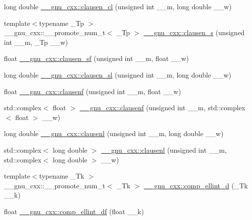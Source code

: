 \begin{DoxyCompactItemize}
\item 
long double \hyperlink{group__gnu__math__spec__func_ga5ff89833dc529ca3de5099e1b9c8525f}{\+\_\+\+\_\+gnu\+\_\+cxx\+::clausen\+\_\+cl} (unsigned int \+\_\+\+\_\+m, long double \+\_\+\+\_\+w)
\item 
{\footnotesize template$<$typename \+\_\+\+Tp $>$ }\\\+\_\+\+\_\+gnu\+\_\+cxx\+::\+\_\+\+\_\+promote\+\_\+num\+\_\+t$<$ \+\_\+\+Tp $>$ \hyperlink{group__gnu__math__spec__func_ga124827c09e71d83eb11b9e3282739475}{\+\_\+\+\_\+gnu\+\_\+cxx\+::clausen\+\_\+s} (unsigned int \+\_\+\+\_\+m, \+\_\+\+Tp \+\_\+\+\_\+w)
\item 
float \hyperlink{group__gnu__math__spec__func_ga2308b5828b5a8003d16cfa0f90826f94}{\+\_\+\+\_\+gnu\+\_\+cxx\+::clausen\+\_\+sf} (unsigned int \+\_\+\+\_\+m, float \+\_\+\+\_\+w)
\item 
long double \hyperlink{group__gnu__math__spec__func_ga6eb205278e3807367b62e07c3f39d915}{\+\_\+\+\_\+gnu\+\_\+cxx\+::clausen\+\_\+sl} (unsigned int \+\_\+\+\_\+m, long double \+\_\+\+\_\+w)
\item 
float \hyperlink{group__gnu__math__spec__func_ga9e228490e55e7936f77ae7a5ef9821dc}{\+\_\+\+\_\+gnu\+\_\+cxx\+::clausenf} (unsigned int \+\_\+\+\_\+m, float \+\_\+\+\_\+w)
\item 
std\+::complex$<$ float $>$ \hyperlink{group__gnu__math__spec__func_ga769ee593c5f1c1d8148abb9bebe50821}{\+\_\+\+\_\+gnu\+\_\+cxx\+::clausenf} (unsigned int \+\_\+\+\_\+m, std\+::complex$<$ float $>$ \+\_\+\+\_\+w)
\item 
long double \hyperlink{group__gnu__math__spec__func_gaac0a4d039044c04cd26c9b8559c441fd}{\+\_\+\+\_\+gnu\+\_\+cxx\+::clausenl} (unsigned int \+\_\+\+\_\+m, long double \+\_\+\+\_\+w)
\item 
std\+::complex$<$ long double $>$ \hyperlink{group__gnu__math__spec__func_ga6e1e9929ace5a66d970c308554473a26}{\+\_\+\+\_\+gnu\+\_\+cxx\+::clausenl} (unsigned int \+\_\+\+\_\+m, std\+::complex$<$ long double $>$ \+\_\+\+\_\+w)
\item 
{\footnotesize template$<$typename \+\_\+\+Tk $>$ }\\\+\_\+\+\_\+gnu\+\_\+cxx\+::\+\_\+\+\_\+promote\+\_\+num\+\_\+t$<$ \+\_\+\+Tk $>$ \hyperlink{group__gnu__math__spec__func_gad0fb35dfc5aef8ba2ba5fb88da1192c7}{\+\_\+\+\_\+gnu\+\_\+cxx\+::comp\+\_\+ellint\+\_\+d} (\+\_\+\+Tk \+\_\+\+\_\+k)
\item 
float \hyperlink{group__gnu__math__spec__func_ga34ac6488b0e7531d5d4b7a8e31ff864e}{\+\_\+\+\_\+gnu\+\_\+cxx\+::comp\+\_\+ellint\+\_\+df} (float \+\_\+\+\_\+k)

\end{DoxyCompactItemize}
